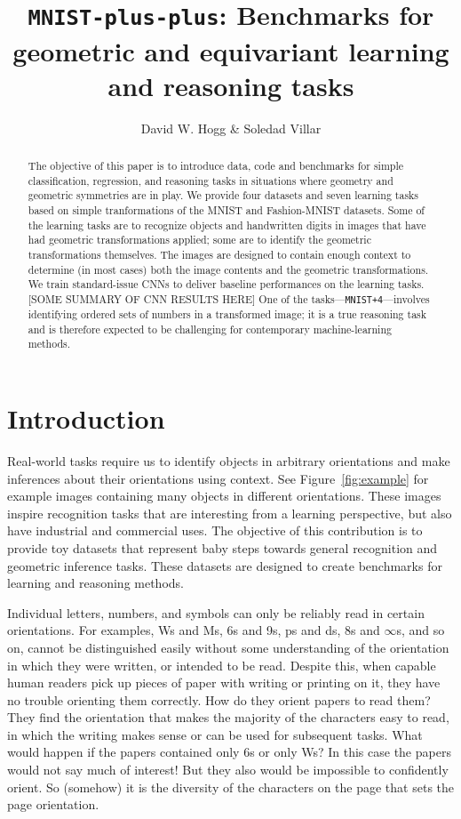 \documentclass{article}
\title{\bfseries \texttt{MNIST-plus-plus}: Benchmarks for geometric and equivariant learning and reasoning tasks}
\author{David W. Hogg \& Soledad Villar}
\date{}
\begin{document}
\maketitle

\begin{abstract}\noindent
    The objective of this paper is to introduce data, code and benchmarks for simple classification, regression, and reasoning tasks in situations where geometry and geometric symmetries are in play.
    We provide four datasets and seven learning tasks based on simple tranformations of the MNIST and Fashion-MNIST datasets.
    Some of the learning tasks are to recognize objects and handwritten digits in images that have had geometric transformations applied; some are to identify the geometric transformations themselves.
    The images are designed to contain enough context to determine (in most cases) both the image contents and the geometric transformations.
    We train standard-issue CNNs to deliver baseline performances on the learning tasks.
    [SOME SUMMARY OF CNN RESULTS HERE]
    One of the tasks---\texttt{MNIST+4}---involves identifying ordered sets of numbers in a transformed image; it is a true reasoning task and is therefore expected to be challenging for contemporary machine-learning methods.
\end{abstract}

\section{Introduction}

Real-world tasks require us to identify objects in arbitrary orientations and make inferences about their orientations using context. 
See Figure~\ref{fig:example} for example images containing many objects in different orientations.
These images inspire recognition tasks that are interesting from a learning perspective, but also have industrial and commercial uses.
The objective of this contribution is to provide toy datasets that represent baby steps towards general recognition and geometric inference tasks.
These datasets are designed to create benchmarks for learning and reasoning methods.

Individual letters, numbers, and symbols can only be reliably read in certain orientations.
For examples, Ws and Ms, 6s and 9s, ps and ds, 8s and $\infty$s, and so on, cannot be distinguished easily without some understanding of the orientation in which they were written, or intended to be read.
Despite this, when capable human readers pick up pieces of paper with writing or printing on it, they have no trouble orienting them correctly.
How do they orient papers to read them?
They find the orientation that makes the majority of the characters easy to read, in which the writing makes sense or can be used for subsequent tasks.
What would happen if the papers contained only 6s or only Ws?
In this case the papers would not say much of interest!
But they also would be impossible to confidently orient.
So (somehow) it is the diversity of the characters on the page that sets the page orientation.
\end{document}
